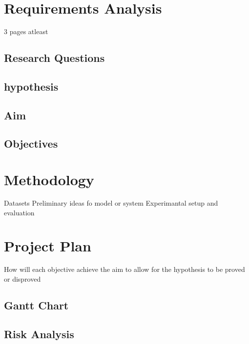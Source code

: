 \documentclass[12pt]{article}
\begin{document}
\section{Requirements Analysis}
3 pages atleast \cite{RN54}

\subsection{Research Questions}
\subsection{hypothesis}
\subsection{Aim}
\subsection{Objectives}

\section{Methodology}
Datasets
Preliminary ideas fo model or system
Experimantal setup and evaluation

\section{Project Plan}
How will each objective achieve the aim to allow for the hypothesis to be proved or disproved

\subsection{Gantt Chart}

\subsection{Risk Analysis}

\newpage


\end{document}
